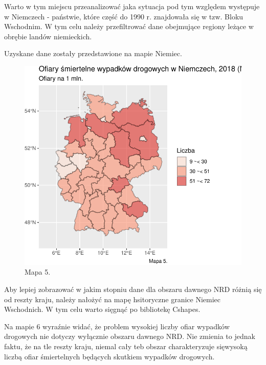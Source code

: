 \documentclass[
]{article}
\begin{document}
Warto w tym miejscu przeanalizować jaka sytuacja pod tym względem
występuje w Niemczech - państwie, które część do 1990 r. znajdowała się
w tzw. Bloku Wschodnim. W tym celu należy przefiltrować dane obejmujące
regiony leżące w obrębie landów niemieckich.

Uzyskane dane zostały przedstawione na mapie Niemiec.

\begin{figure}

\includegraphics{raport_wypadki_files/figure-latex/unnamed-chunk-26-1} \hfill{}

\caption{Mapa 5.}\label{fig:unnamed-chunk-26}
\end{figure}

Aby lepiej zobrazować w jakim stopniu dane dla obszaru dawnego NRD
różnią się od reszty kraju, należy nałożyć na mapę hsitoryczne granice
Niemiec Wschodnich. W tym celu warto sięgnąć po bibliotekę Cshapes.

Na mapie 6 wyraźnie widać, że problem wysokiej liczby ofiar wypadków
drogowych nie dotyczy wyłącznie obszaru dawnego NRD. Nie zmienia to
jednak faktu, że na tle reszty kraju, niemal cały teb obszar
charakteryzuje sięwysoką liczbą ofiar śmiertelnych będących skutkiem
wypadków drogowych.
\end{document}
